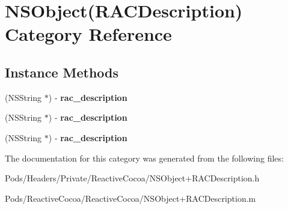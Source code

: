 \hypertarget{category_n_s_object_07_r_a_c_description_08}{}\section{N\+S\+Object(R\+A\+C\+Description) Category Reference}
\label{category_n_s_object_07_r_a_c_description_08}
\subsection*{Instance Methods}
\begin{DoxyCompactItemize}
\item 
\mbox{\label{category_n_s_object_07_r_a_c_description_08_aeb613d805fee139f0b7f5a44d5fb4718}} 
(N\+S\+String $\ast$) -\/ {\bfseries rac\+\_\+description}
\item 
\mbox{\label{category_n_s_object_07_r_a_c_description_08_aeb613d805fee139f0b7f5a44d5fb4718}} 
(N\+S\+String $\ast$) -\/ {\bfseries rac\+\_\+description}
\item 
\mbox{\label{category_n_s_object_07_r_a_c_description_08_aeb613d805fee139f0b7f5a44d5fb4718}} 
(N\+S\+String $\ast$) -\/ {\bfseries rac\+\_\+description}
\end{DoxyCompactItemize}


The documentation for this category was generated from the following files\+:\begin{DoxyCompactItemize}
\item 
Pods/\+Headers/\+Private/\+Reactive\+Cocoa/N\+S\+Object+\+R\+A\+C\+Description.\+h\item 
Pods/\+Reactive\+Cocoa/\+Reactive\+Cocoa/N\+S\+Object+\+R\+A\+C\+Description.\+m\end{DoxyCompactItemize}

